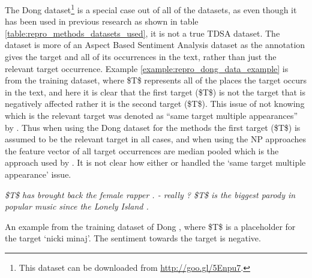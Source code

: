 The Dong dataset\footnote{This dataset can be downloaded from \url{http://goo.gl/5Enpu7}.} is a special case out of all of the datasets, as even though it has been used in previous research as shown in table \ref{table:repro_methods_datasets_used}, it is not a true TDSA dataset. The dataset is more of an Aspect Based Sentiment Analysis dataset as the annotation gives the target and all of its occurrences in the text, rather than just the relevant target occurrence. Example \ref{example:repro_dong_data_example} is from the training dataset, where \$T\$ represents all of the places the target occurs in the text, and here it is clear that the first target (\$T\$) is not the target that is negatively affected rather it is the second target (\$T\$). This issue of not knowing which is the relevant target was denoted as ``same target multiple appearances'' by \citet{wang-etal-2017-tdparse}. Thus when using the Dong dataset for the \citet{tang-etal-2016-effective} methods the first target (\$T\$) is assumed to be the relevant target in all cases, and when using the NP approaches the feature vector of all target occurrences are median pooled which is the approach used by \citet{wang-etal-2017-tdparse}. It is not clear how either \citet{vo2015target} or \citet{tang-etal-2016-effective} handled the `same target multiple appearance' issue.

\begin{example}
\textit{\$T\$ has brought back the female rapper . - really ? \$T\$ is the biggest parody in popular music since the Lonely Island .}
\caption{An example from the training dataset of Dong \citep{dong-etal-2014-adaptive}, where \$T\$ is a placeholder for the target `nicki minaj'. The sentiment towards the target is negative.}
\label{example:repro_dong_data_example}
\end{example}

